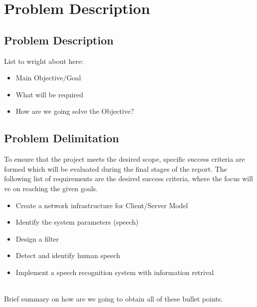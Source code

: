 \chapter{Problem Description}\label{ch:problem_description}

\section{Problem Description}
List to wright about here:

\begin{itemize}
  \item Main Objective/Goal
  \item What will be required
  \item How are we going solve the Objective?
\end{itemize}
\section{Problem Delimitation}
To ensure that the project meets the desired scope, specific success criteria are formed which will be evaluated during the final stages of the report. The following list of requirements are the desired success criteria, where the focus will ve on reaching the given goals.

\begin{itemize}
  \item Create a network infrastructure for Client/Server Model
  \item Identify the system parameters (speech)
  \item Design a filter 
  \item Detect and identify human speech
  \item Implement a speech recognition system with information retrival
\end{itemize}
\ \\
Brief summary on how are we going to obtain all of these bullet points.
